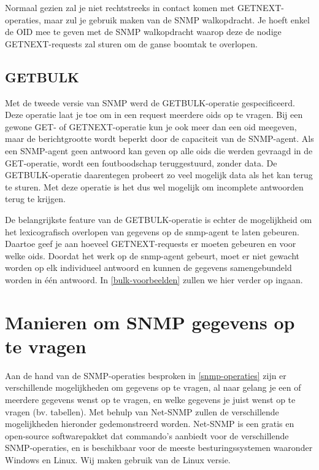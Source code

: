 Normaal gezien zal je niet rechtstreeks in contact komen met GETNEXT-operaties, maar zul je gebruik maken van de SNMP walkopdracht.
Je hoeft enkel de OID mee te geven met de SNMP walkopdracht waarop deze de nodige GETNEXT-requests zal sturen om de ganse boomtak te overlopen.



\subsection{GETBULK}
Met de tweede versie van SNMP werd de GETBULK-operatie gespecificeerd.
Deze operatie laat je toe om in een request meerdere \glspl{oid} op te vragen.
Bij een gewone GET- of GETNEXT-operatie kun je ook meer dan een \gls{oid} meegeven, maar de berichtgrootte wordt beperkt door de capaciteit van de SNMP-agent.
Als een SNMP-agent geen antwoord kan geven op alle \glspl{oid} die werden gevraagd in de GET-operatie, wordt een foutboodschap teruggestuurd, zonder data.
De GETBULK-operatie daarentegen probeert zo veel mogelijk data als het kan terug te sturen.
Met deze operatie is het dus wel mogelijk om incomplete antwoorden terug te krijgen.\cite{essentialsnmp}

De belangrijkste feature van de GETBULK-operatie is echter de mogelijkheid om het lexicografisch overlopen van gegevens op de \gls{snmp-agent} te laten gebeuren.
Daartoe geef je aan hoeveel GETNEXT-requests er moeten gebeuren en voor welke \glspl{oid}.
Doordat het werk op de \gls{snmp-agent} gebeurt, moet er niet gewacht worden op elk individueel antwoord en kunnen de gegevens samengebundeld worden in één antwoord.
In \cref{bulk-voorbeelden} zullen we hier verder op ingaan.

\section{Manieren om SNMP gegevens op te vragen}
\label{manieren-om-snmp-gegevens-op-te-vragen}

Aan de hand van de SNMP-operaties besproken in \cref{snmp-operaties} zijn er verschillende mogelijkheden om gegevens op te vragen,
al naar gelang je een of meerdere gegevens wenst op te vragen, en welke gegevens{} je juist wenst op te vragen (bv. tabellen).
Met behulp van Net-SNMP zullen de verschillende mogelijkheden hieronder gedemonstreerd worden.
Net-SNMP is een gratis en open-source softwarepakket dat commando's aanbiedt voor de verschillende SNMP-operaties,
en is beschikbaar voor de meeste besturingssystemen waaronder Windows en Linux.
Wij maken gebruik van de Linux versie.


